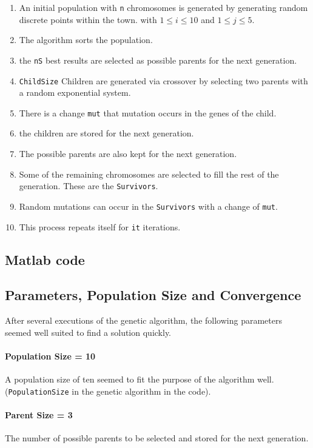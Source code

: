 \documentclass[10pt,a4paper]{article}
\begin{document}
\begin{enumerate}
\item An initial population with \texttt{n} chromosomes is generated by generating random discrete points within the town. with $ 1 \leq i \leq 10$ and $ 1 \leq j \leq 5$.
\item The  algorithm sorts the  population.
\item the \texttt{nS} best results are selected as possible parents for the next generation.
\item \texttt{ChildSize} Children are generated via crossover by selecting two parents with a random exponential system.
\item There is a change \texttt{mut} that mutation occurs in the genes of the child.
\item the children are stored for the next generation.
\item The possible parents are also kept for the next generation.
\item Some of the remaining chromosomes are selected to fill the rest of the generation. These are the \texttt{Survivors}.
\item Random mutations can occur in the \texttt{Survivors} with a change of \texttt{mut}.
\item This process repeats itself for \texttt{it} iterations.
\end{enumerate}

\subsection{Matlab code}


\subsection{Parameters, Population Size and Convergence}
After several executions of the genetic algorithm, the following parameters seemed well suited to find a solution quickly.

\paragraph{Population Size = 10} A population size of ten seemed to fit the purpose of the algorithm well. (\texttt{PopulationSize} in the genetic algorithm in the code).
\paragraph{Parent Size = 3} The number of possible parents to be selected and stored for the next generation.
\end{document}
